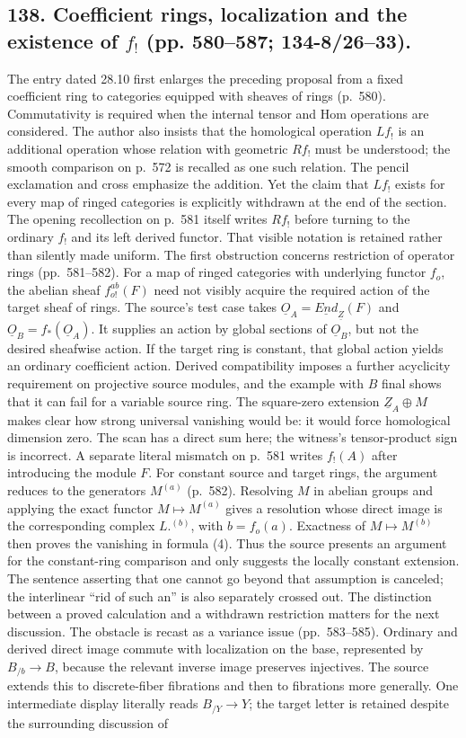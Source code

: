 \documentclass[10pt,oneside]{book}
\begin{document}
\subsection*{138. Coefficient rings, localization and the existence of $f_!$ (pp. 580--587; 134-8/26--33).}
The entry dated 28.10 first enlarges the preceding proposal from a fixed coefficient ring to categories equipped with sheaves of rings (p.~580). Commutativity is required when the internal tensor and Hom operations are considered. The author also insists that the homological operation $Lf_!$ is an additional operation whose relation with geometric $Rf_!$ must be understood; the smooth comparison on p.~572 is recalled as one such relation. The pencil exclamation and cross emphasize the addition. Yet the claim that $Lf_!$ exists for every map of ringed categories is explicitly withdrawn at the end of the section. The opening recollection on p.~581 itself writes $Rf_!$ before turning to the ordinary $f_!$ and its left derived functor. That visible notation is retained rather than silently made uniform. The first obstruction concerns restriction of operator rings (pp.~581--582). For a map of ringed categories with underlying functor $f_o$, the abelian sheaf $f^{ab}_{o!}(F)$ need not visibly acquire the required action of the target sheaf of rings. The source's test case takes $\underline O_A=\underline{End}_{\underline Z}(F)$ and $\underline O_B=f_*(\underline O_A)$. It supplies an action by global sections of $\underline O_B$, but not the desired sheafwise action. If the target ring is constant, that global action yields an ordinary coefficient action. Derived compatibility imposes a further acyclicity requirement on projective source modules, and the example with $B$ final shows that it can fail for a variable source ring. The square-zero extension $\underline Z_A\oplus M$ makes clear how strong universal vanishing would be: it would force homological dimension zero. The scan has a direct sum here; the witness's tensor-product sign is incorrect. A separate literal mismatch on p.~581 writes $f_!(A)$ after introducing the module $F$. For constant source and target rings, the argument reduces to the generators $M^{(a)}$ (p.~582). Resolving $M$ in abelian groups and applying the exact functor $M\mapsto M^{(a)}$ gives a resolution whose direct image is the corresponding complex $L.^{(b)}$, with $b=f_o(a)$. Exactness of $M\mapsto M^{(b)}$ then proves the vanishing in formula (4). Thus the source presents an argument for the constant-ring comparison and only suggests the locally constant extension. The sentence asserting that one cannot go beyond that assumption is canceled; the interlinear ``rid of such an'' is also separately crossed out. The distinction between a proved calculation and a withdrawn restriction matters for the next discussion. The obstacle is recast as a variance issue (pp.~583--585). Ordinary and derived direct image commute with localization on the base, represented by $B_{/b}\to B$, because the relevant inverse image preserves injectives. The source extends this to discrete-fiber fibrations and then to fibrations more generally. One intermediate display literally reads $B_{/Y}\to Y$; the target letter is retained despite the surrounding discussion of 
\end{document}
